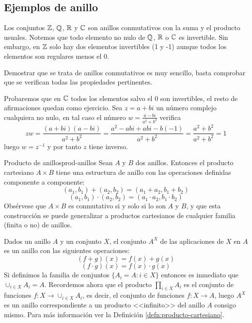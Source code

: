 \subsection{Ejemplos de anillo}
\begin{example}{}{}
    Los conjuntos $\mathbb{Z}$, $\mathbb{Q}$, $\mathbb{R}$ y $\mathbb{C}$ son anillos conmutativos con la suma y el producto usuales. Notemos que todo elemento no nulo de $\mathbb{Q}$, $\mathbb{R}$ o $\mathbb{C}$ es invertible. Sin embargo, en $\mathbb{Z}$ solo hay dos elementos invertibles (1 y -1) aunque todos los elementos son regulares menos el 0.
\end{example}

\begin{proofbox}
    Demostrar que se trata de anillos conmutativos es muy sencillo, basta comprobar que se verifican todas las propiedades pertinentes.
    
    Probaremos que en $\mathbb{C}$ todos los elementos salvo el 0 son invertibles, el resto de afirmaciones quedan como ejercicio. Sea $z = a + bi$ un número complejo cualquiera no nulo, en tal caso el número $w = \frac{a-bi}{a^2+b^2}$ verifica
    \[
    zw = \frac{(a+bi)(a-bi)}{a^2+b^2} = \frac{a^2 -abi +abi -b(-1)}{a^2+b^2} = \frac{a^2+b^2}{a^2+b^2} = 1
    \]
    luego $w = z^{-1}$ y por tanto $z$ tiene inverso.
\end{proofbox}

\begin{example}{Producto de anillos}{prod-anillos}
    Sean $A$ y $B$ dos anillos. Entonces el producto cartesiano $A \times B$ tiene una estructura de anillo con las operaciones definidas componente a componente:
    \[
    (a_1, b_1) + (a_2, b_2) = (a_1 + a_2, b_1 + b_2)
    \]
    \[
    (a_1, b_1) \cdot (a_2, b_2) = (a_1 \cdot a_2, b_1 \cdot b_2)
    \]
    Obsérvese que $A \times B$ es conmutativo si y solo si lo son $A$ y $B$, y que esta construcción se puede generalizar a productos cartesianos de cualquier familia (finita o no) de anillos.
\end{example}


\begin{example}{}{}
    Dados un anillo $A$ y un conjunto $X$, el conjunto $A^X$ de las aplicaciones de $X$ en $A$ es un anillo con las siguientes operaciones:
    \[
    (f + g)(x) = f(x) + g(x)
    \]
    \[
    (f \cdot g)(x) = f(x) \cdot g(x)
    \]
    Si definimos la familia de conjuntos $\{A_i = A : i \in X\}$ entonces es inmediato que $\cup_{i\in X} A_i = A$. Recordemos ahora que el producto $\prod_{i \in X} A_i$ es el conjunto de funciones $f: X \to \cup_{i\in X} A_i$, es decir, el conjunto de funciones $f : X \to A$, luego $A^X$ es un anillo correspondiente a un producto <<infinito>> del anillo $A$ consigo mismo. Para más información ver la Definición \ref{defn:producto-cartesiano}.
\end{example}

